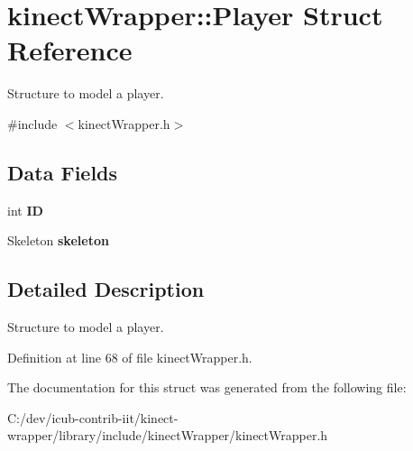 \section{kinect\+Wrapper\+:\+:Player Struct Reference}
\label{structkinectWrapper_1_1Player}


Structure to model a player.  




{\ttfamily \#include $<$kinect\+Wrapper.\+h$>$}

\subsection*{Data Fields}
\begin{DoxyCompactItemize}
\item 
int {\bfseries I\+D}\label{structkinectWrapper_1_1Player_a9247d884d641c97fef238d71ca59eb71}

\item 
Skeleton {\bfseries skeleton}\label{structkinectWrapper_1_1Player_a8d401014445c61c049db52523cf3d5f1}

\end{DoxyCompactItemize}


\subsection{Detailed Description}
Structure to model a player. 

Definition at line 68 of file kinect\+Wrapper.\+h.



The documentation for this struct was generated from the following file\+:\begin{DoxyCompactItemize}
\item 
C\+:/dev/icub-\/contrib-\/iit/kinect-\/wrapper/library/include/kinect\+Wrapper/kinect\+Wrapper.\+h\end{DoxyCompactItemize}
